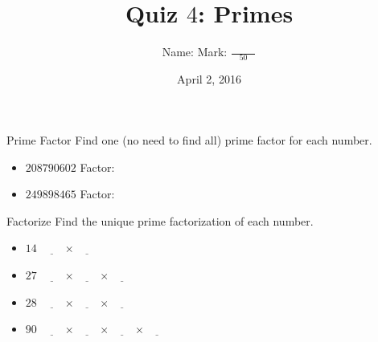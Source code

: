 \documentclass[12pt,letterpaper]{article}
\title{Quiz $4$: Primes}
\author{Name: \underline{\hspace{5cm}} Mark: $\displaystyle \frac{\hspace{3em}}{50}$}
\date{April 2, 2016}
\begin{document}
\maketitle

\thispagestyle{empty}

\begin{problem}{Prime Factor}
 Find one (no need to find all) prime factor for each number.

 \begin{itemize}
  \item $208790602$ \hfill Factor: \underline{\hspace{2em}}
  \item $249898465$ \hfill Factor: \underline{\hspace{2em}}
 \end{itemize}

\end{problem}

\begin{problem}{Factorize}
 Find the unique prime factorization of each number.

 \begin{itemize}
  \item $14$ \hfill $\underline{\hspace{2em}} \times
  \underline{\hspace{2em}}$
  \item $27$ \hfill $\underline{\hspace{2em}} \times
  \underline{\hspace{2em}} \times \underline{\hspace{2em}}$
  \item $28$ \hfill $\underline{\hspace{2em}} \times
  \underline{\hspace{2em}} \times
  \underline{\hspace{2em}}$
  \item $90$ \hfill $\underline{\hspace{2em}} \times
  \underline{\hspace{2em}} \times \underline{\hspace{2em}}
  \times \underline{\hspace{2em}}$
 \end{itemize}
\end{problem}
\end{document}
